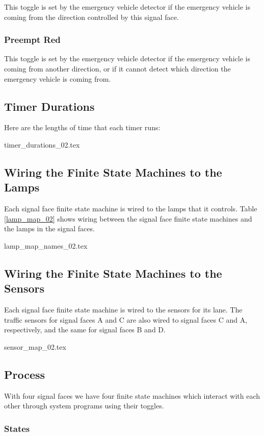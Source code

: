\documentclass[letterpaper,twoside]{article}
\begin{document}
This toggle is set by the emergency vehicle detector if the emergency
vehicle is coming from the direction controlled by this signal face.

\subsubsection{Preempt Red}

This toggle is set by the emergency vehicle detector if the emergency
vehicle is coming from another direction, or if it cannot detect
which direction the emergency vehicle is coming from.

\subsection{Timer Durations}

Here are the lengths of time that each timer runs:

 {timer_durations_02.tex}

\subsection{Wiring the Finite State Machines to the Lamps}

Each signal face finite state machine is wired to the lamps that
it controls.  Table \ref{lamp_map_02} shows wiring between the signal
face finite state machines and the lamps in the signal faces.

 {lamp_map_names_02.tex}

\subsection{Wiring the Finite State Machines to the Sensors}

Each signal face finite state machine is wired to the sensors
for its lane.  The traffic sensors for signal faces A and C
are also wired to signal faces C and A, respectively, and
the same for signal faces B and D.

 {sensor_map_02.tex}

\subsection{Process}

With four signal faces we have four finite state machines which
interact with each other through system programs using their
toggles.

\subsubsection{States}
\end{document}
